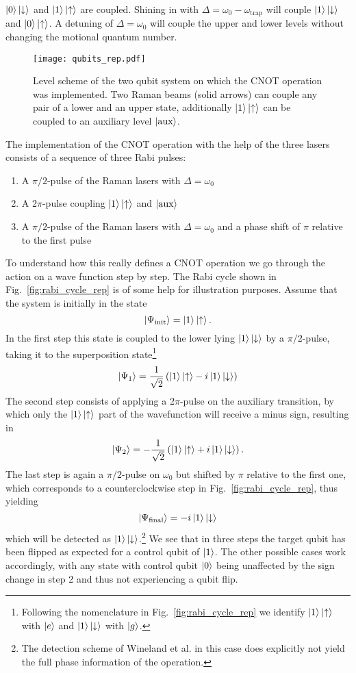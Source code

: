 $\ket{0}\ket{\downarrow}$ and $\ket{1}\ket{\uparrow}$ are coupled. Shining in
with $\Delta = \omega_0 - \omega_\text{trap}$ will couple
$\ket{1}\ket{\downarrow}$ and $\ket{0}\ket{\uparrow}$. A detuning of $\Delta =
\omega_0$ will couple the upper and lower levels without changing the motional
quantum number. 
\begin{figure}[t]
  \centering
  \texttt{[image: qubits\_rep.pdf]}
  \caption{Level scheme of the two qubit system on which the CNOT operation was 
   implemented. Two Raman beams (solid arrows) can couple any pair of a lower 
   and an upper state, additionally $\ket{1}\ket{\uparrow}$ can be coupled to an 
   auxiliary level $\ket{\text{aux}}$.}
  \label{fig:qubits_rep}
\end{figure}

The implementation of the CNOT operation with the help of the three lasers
consists of a sequence of three Rabi pulses:
\begin{enumerate}
  \item A $\pi/2$-pulse of the Raman lasers with $\Delta=\omega_0$
  \item A 2$\pi$-pulse coupling $\ket{1}\ket{\uparrow}$ and $\ket{\text{aux}}$
  \item A $\pi/2$-pulse of the Raman lasers with $\Delta=\omega_0$ and a phase shift of $\pi$ relative
    to the first pulse
\end{enumerate}
To understand how this really defines a CNOT operation we go through the action
on a wave function step by step. The Rabi cycle shown in
Fig.~\ref{fig:rabi_cycle_rep} is of some help for illustration purposes. Assume
that the system is initially in the state
$$ \ket{\Psi_\text{init}} = \ket{1}\ket{\uparrow}.$$
In the first step this state is coupled to the lower lying $\ket{1}\ket{\downarrow}$ by a
$\pi/2$-pulse, taking it to the superposition state\footnote{Following the
nomenclature in Fig.~\ref{fig:rabi_cycle_rep} we identify
$\ket{1}\ket{\uparrow}$ with $\ket{e}$ and $\ket{1}\ket{\downarrow}$ with
$\ket{g}$.}
$$ \ket{\Psi_1} = \frac{1}{\sqrt{2}}\left(\ket{1}\ket{\uparrow}
-i\ket{1}\ket{\downarrow}\right)$$
The second step consists of applying a 2$\pi$-pulse on the auxiliary transition,
by which only the $\ket{1}\ket{\uparrow}$ part of the wavefunction will receive
a minus sign, resulting in
$$ \ket{\Psi_2} = -\frac{1}{\sqrt{2}}\left(\ket{1}\ket{\uparrow} + i
\ket{1}\ket{\downarrow}\right).$$
The last step is again a $\pi/2$-pulse on $\omega_0$ but shifted by $\pi$
relative to the first one, which corresponds to a counterclockwise step in
Fig.~\ref{fig:rabi_cycle_rep}, thus yielding
$$ \ket{\Psi_\text{final}} = -i\ket{1}\ket{\downarrow}$$
which will be detected as $\ket{1}\ket{\downarrow}$.\footnote{The detection
scheme of Wineland et al. in this case does explicitly not yield the full phase
information of the operation.} We see that in three steps
the target qubit has been flipped as expected for a control qubit of $\ket{1}$.
The other possible cases work accordingly, with any state with control qubit 
$\ket{0}$ being unaffected by the sign change in step 2 and thus not
experiencing a qubit flip.

